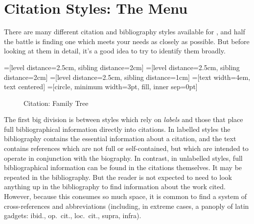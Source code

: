 \chapter{Citation Styles: The Menu}

There are many different citation and bibliography styles available
for \biblatex, and half the battle is finding one which meets your
needs as closely as possible. But before looking at them in detail,
it's a good idea to try to identify them broadly.

=[level distance=2.5cm, sibling distance=2cm]
=[level distance=2.5cm, sibling distance=2cm]
=[level distance=2.5cm, sibling distance=1cm]
=[text width=4em, text centered]
=[circle, minimum width=3pt, fill, inner sep=0pt]

\begin{figure}
\sffamily
{}
\caption{Citation: Family Tree}
\end{figure}

The first big division is between styles which rely on \emph{labels}
and those that place full bibliographical information directly into
citations. In labelled styles the bibliography contains the essential
information about a citation, and the text contains references which
are not full or self-contained, but which are intended to operate in
conjunction with the biography. In contrast, in unlabelled styles,
full bibliographical information can be found in the citations
themselves. It may be repeated in the bibliography. But the reader is
not expected to need to look anything up in the bibliography to find
information about the work cited. However, because this consumes so
much space, it is common to find a system of cross-references
and abbreviations (including, in extreme cases, a panoply of latin
gadgets: ibid., op.\ cit., loc.\ cit., supra, infra).

